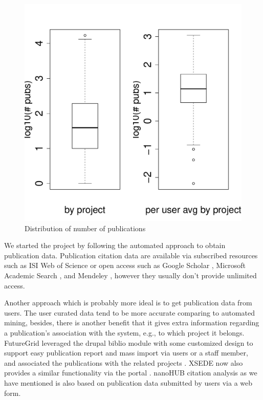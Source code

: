 \begin{figure}[htb]
  \centering
    \includegraphics[width=1.0\columnwidth]{images/01_dist_npubs_proj.pdf}
  \caption{Distribution of number of publications}\label{F:dist-npubs-proj}
\end{figure}

We started the project by following the automated approach to obtain publication data. Publication citation data are available via subscribed resources such as ISI Web of Science \cite{www-isiwos} or open access such as Google Scholar \cite{www-googlescholar}, Microsoft Academic Search \cite{www-msas}, and Mendeley \cite{www-mendeley}, however they usually don't provide unlimited access.

Another approach which is probably more ideal is to get publication data from users. The user curated data tend to be more accurate comparing to automated mining, besides, there is another benefit that it gives extra information regarding a publication's association with the system, e.g., to which project it belongs. FutureGrid leveraged the drupal biblio module \cite{www-drupal-bib} with some customized design to support easy publication report and mass import via users or a staff member, and associated the publications with the related projects \cite{www-fgbiblio}. XSEDE now also provides a similar functionality via the portal \cite{www-xdportalpub}. nanoHUB citation analysis \cite{www-nanohubcite} as we have mentioned is also based on publication data submitted by users via a web form.

